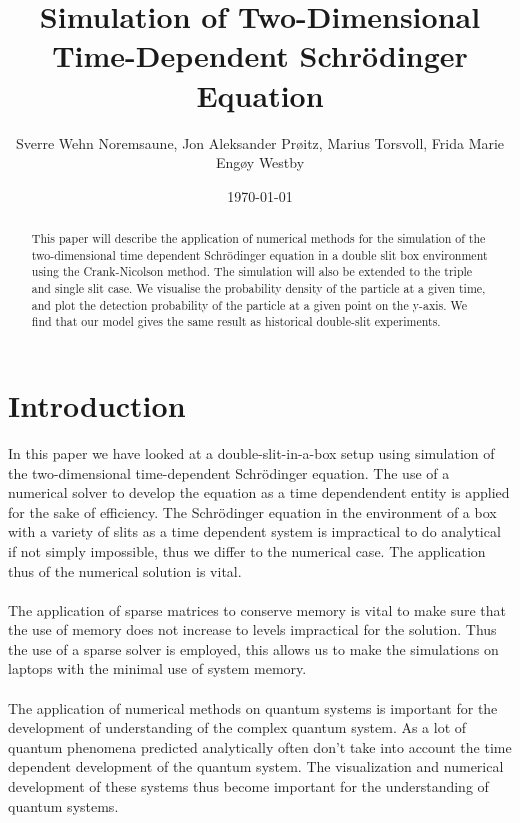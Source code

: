\documentclass[english,notitlepage,reprint,nofootinbib]{revtex4-1}  %
\begin{document}
	
	\title{Simulation of Two-Dimensional Time-Dependent Schrödinger Equation}  %
	\author{Sverre Wehn Noremsaune, Jon Aleksander Prøitz, Marius Torsvoll, Frida Marie Engøy Westby} %
	\date{\today}                             %
	\noaffiliation                            %
	
	\begin{abstract}
		This paper will describe the application of numerical methods for the simulation of the two-dimensional time dependent Schrödinger equation in a double slit box environment using the Crank-Nicolson method. The simulation will also be extended to the triple and single slit case. We visualise the probability density of the particle at a given time, and plot the detection probability of the particle at a given point on the y-axis. We find that our model gives the same result as historical double-slit experiments.
	\end{abstract}
	\maketitle
	
	
	\section{Introduction}
	In this paper we have looked at a double-slit-in-a-box setup using simulation of the two-dimensional time-dependent Schrödinger equation. The use of a numerical solver to develop the equation as a time dependendent entity is applied for the sake of efficiency. The Schrödinger equation in the environment of a box with a variety of slits as a time dependent system is impractical to do analytical if not simply impossible, thus we differ to the numerical case. The application thus of the numerical solution is vital. 
	\\
	\\
	
	The application of sparse matrices to conserve memory is vital to make sure that the use of memory does not increase to levels impractical for the solution. Thus the use of a sparse solver is employed, this allows us to make the simulations on laptops with the minimal use of system memory. 
	\\
	\\
	
	The application of numerical methods on quantum systems is important for the development of understanding of the complex quantum system. As a lot of quantum phenomena predicted analytically often don't take into account the time dependent development of the quantum system. The visualization and numerical development of these systems thus become important for the understanding of quantum systems. 
	\\
	\\
	
\end{document}
